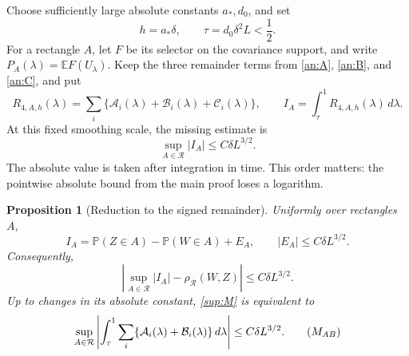 \documentclass[11pt,a4paper]{article}
\newtheorem{proposition}{Proposition}
\theoremstyle{remark}
\newcommand{\E}{\mathbb E}
\newcommand{\Pp}{\mathbb P}
\newcommand{\cR}{\mathcal R}
\newcommand{\rh}{\rho_{\mathcal R}}
\newcommand{\dd}{\,d}
\begin{document}
Choose sufficiently large absolute constants \(a_*,d_0\), and set
\[
 h=a_*\delta,\qquad \tau=d_0\delta^2L<\frac12.
\]
For a rectangle \(A\), let \(F\) be its selector on the covariance
support, and write \(P_A(\lambda)=\E F(U_\lambda)\). Keep the three
remainder terms from \eqref{an:A}, \eqref{an:B}, and \eqref{an:C}, and put
\begin{equation}
 R_{4,A,h}(\lambda)=\sum_i
       \{\mathcal A_i(\lambda)+\mathcal B_i(\lambda)+\mathcal C_i(\lambda)\},
 \qquad I_A=\int_\tau^1 R_{4,A,h}(\lambda)\dd\lambda.
 \label{sup:I}
\end{equation}
At this fixed smoothing scale, the missing estimate is
\begin{equation}
 \sup_{A\in\cR}|I_A|\le C\delta L^{3/2}.
 \tag{M}\label{sup:M}
\end{equation}
The absolute value is taken after integration in time. This order
matters: the pointwise absolute bound from the main proof loses a
logarithm.

\begin{proposition}[Reduction to the signed remainder]
\label{sup:reduction}
Uniformly over rectangles \(A\),
\begin{equation}
 I_A=\Pp(Z\in A)-\Pp(W\in A)+E_A,
 \qquad |E_A|\le C\delta L^{3/2}.
 \label{sup:exact-reduction}
\end{equation}
Consequently,
\begin{equation}
 \left|\sup_{A\in\cR}|I_A|-\rh(W,Z)\right|
 \le C\delta L^{3/2}.
 \label{sup:distance-reduction}
\end{equation}
Up to changes in its absolute constant, \eqref{sup:M} is equivalent to
\begin{equation}
 \sup_{A\in\cR}
 \left|\int_\tau^1\sum_i
       \{\mathcal A_i(\lambda)+\mathcal B_i(\lambda)\}\dd\lambda\right|
 \le C\delta L^{3/2}.
 \tag{$M_{AB}$}\label{sup:MAB}
\end{equation}
\end{proposition}
\end{document}
